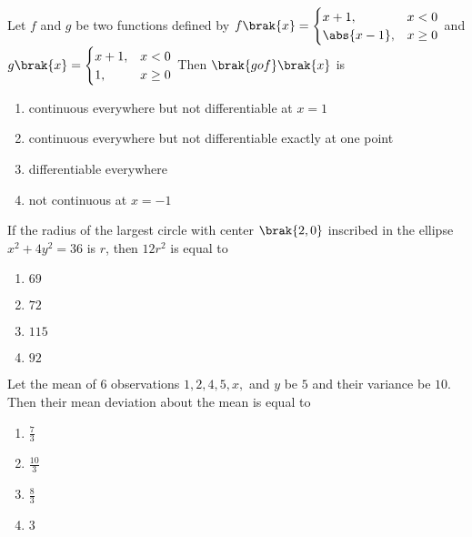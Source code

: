 \item Let $f$ and $g$ be two functions defined by $f\brak{x} = \begin{cases} 
x + 1, & x < 0 \\ 
\abs{x - 1}, & x \geq 0 
\end{cases}$ and $g\brak{x} = \begin{cases} 
x + 1, & x < 0 \\ 
1, & x \geq 0 
\end{cases}$ Then $\brak{gof}\brak{x}$ is \hfill {}
\begin{enumerate}
    \item continuous everywhere but not differentiable at $x = 1$
    \item continuous everywhere but not differentiable exactly at one point
    \item differentiable everywhere
    \item not continuous at $x = -1$
\end{enumerate}


\item If the radius of the largest circle with center $\brak{2, 0}$ inscribed in the ellipse $x^2 + 4y^2 = 36$ is $r$, then $12r^2$ is equal to \hfill {}
\begin{multicols}{4}
\begin{enumerate}
    \item $69$
    \item $72$
    \item $115$
    \item $92$
\end{enumerate}
\end{multicols}


\item Let the mean of 6 observations $1, 2, 4, 5, x,$ and $y$ be $5$ and their variance be $10$. Then their mean deviation about the mean is equal to \hfill {}
\begin{multicols}{4}
\begin{enumerate}
    \item $\frac{7}{3}$
    \item $\frac{10}{3}$
    \item $\frac{8}{3}$
    \item $3$
\end{enumerate}
\end{multicols}


